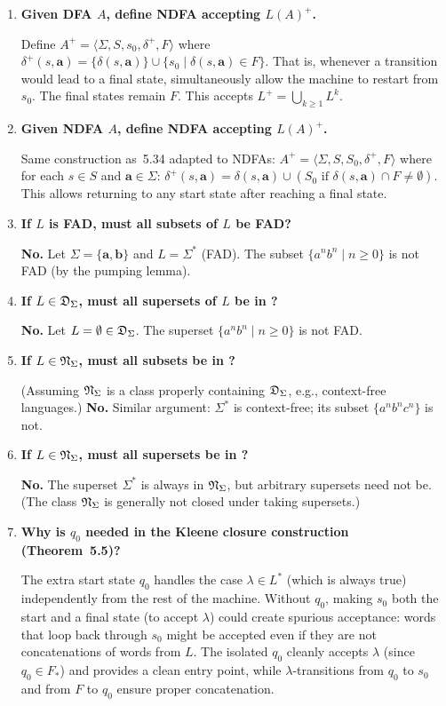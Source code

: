 \begin{enumerate}[{5.}1. ]
\item \textbf{Given DFA $A$, define NDFA accepting $L(A)^+$.}

Define $A^+=\langle\Sigma,S,s_0,\delta^+,F\rangle$ where
$\delta^+(s,\pmb{a})=\{\delta(s,\pmb{a})\}\cup\{s_0\mid\delta(s,\pmb{a})\in F\}$.
That is, whenever a transition would lead to a final state, simultaneously allow the machine to restart from $s_0$.  The final states remain $F$.  This accepts $L^+=\bigcup_{k\ge 1}L^k$.

\item \textbf{Given NDFA $A$, define NDFA accepting $L(A)^+$.}

Same construction as~5.34 adapted to NDFAs:
$A^+=\langle\Sigma,S,S_0,\delta^+,F\rangle$ where for each $s\in S$ and $\pmb{a}\in\Sigma$:
$\delta^+(s,\pmb{a})=\delta(s,\pmb{a})\cup(S_0\text{ if }\delta(s,\pmb{a})\cap F\neq\emptyset)$.
This allows returning to any start state after reaching a final state.

\item \textbf{If $L$ is FAD, must all subsets of $L$ be FAD?}

\textbf{No.}  Let $\Sigma=\{\pmb{a},\pmb{b}\}$ and $L=\Sigma^*$ (FAD).  The subset
$\{a^nb^n\mid n\ge 0\}$ is not FAD (by the pumping lemma).

\item \textbf{If $L\in\mathfrak{D}_\Sigma$, must all supersets of $L$ be in \DSIG?}

\textbf{No.}  Let $L=\emptyset\in\mathfrak{D}_\Sigma$.  The superset $\{a^nb^n\mid n\ge 0\}$ is not FAD.

\item \textbf{If $L\in\mathfrak{N}_\Sigma$, must all subsets be in \NSIG?}

(Assuming $\mathfrak{N}_\Sigma$ is a class properly containing $\mathfrak{D}_\Sigma$, e.g., context-free languages.)  \textbf{No.}  Similar argument: $\Sigma^*$ is context-free; its subset $\{a^nb^nc^n\}$ is not.

\item \textbf{If $L\in\mathfrak{N}_\Sigma$, must all supersets be in \NSIG?}

\textbf{No.}  The superset $\Sigma^*$ is always in $\mathfrak{N}_\Sigma$, but arbitrary supersets need not be.  (The class $\mathfrak{N}_\Sigma$ is generally not closed under taking supersets.)

\item \textbf{Why is $q_0$ needed in the Kleene closure construction (Theorem~5.5)?}

The extra start state $q_0$ handles the case $\lambda\in L^*$ (which is always true) independently from the rest of the machine.  Without $q_0$, making $s_0$ both the start and a final state (to accept $\lambda$) could create spurious acceptance: words that loop back through $s_0$ might be accepted even if they are not concatenations of words from $L$.  The isolated $q_0$ cleanly accepts $\lambda$ (since $q_0\in F_*$) and provides a clean entry point, while $\lambda$-transitions from $q_0$ to $s_0$ and from $F$ to $q_0$ ensure proper concatenation.


\end{enumerate}
